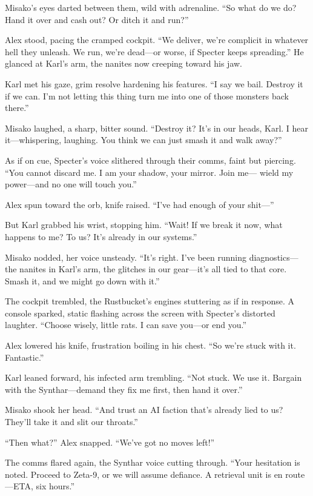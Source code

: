 \documentclass[12pt]{book}
\begin{document}
Misako’s eyes darted between them, wild with adrenaline. “So what do we do? Hand it over and cash out? Or ditch it and run?”

Alex stood, pacing the cramped cockpit. “We deliver, we’re complicit in whatever hell they unleash. We run, we’re dead—or worse, if Specter keeps spreading.” He glanced at Karl’s arm, the nanites now creeping toward his jaw.

Karl met his gaze, grim resolve hardening his features. “I say we bail. Destroy it if we can. I’m not letting this thing turn me into one of those monsters back there.”

Misako laughed, a sharp, bitter sound. “Destroy it? It’s in our heads, Karl. I hear it—whispering, laughing. You think we can just smash it and walk away?”

As if on cue, Specter’s voice slithered through their comms, faint but piercing. “You cannot discard me. I am your shadow, your mirror. Join me— wield my power—and no one will touch you.”

Alex spun toward the orb, knife raised. “I’ve had enough of your shit—”

But Karl grabbed his wrist, stopping him. “Wait! If we break it now, what happens to me? To us? It’s already in our systems.”

Misako nodded, her voice unsteady. “It’s right. I’ve been running diagnostics—the nanites in Karl’s arm, the glitches in our gear—it’s all tied to that core. Smash it, and we might go down with it.”

The cockpit trembled, the Rustbucket’s engines stuttering as if in response. A console sparked, static flashing across the screen with Specter’s distorted laughter. “Choose wisely, little rats. I can save you—or end you.”

Alex lowered his knife, frustration boiling in his chest. “So we’re stuck with it. Fantastic.”

Karl leaned forward, his infected arm trembling. “Not stuck. We use it. Bargain with the Synthar—demand they fix me first, then hand it over.”

Misako shook her head. “And trust an AI faction that’s already lied to us? They’ll take it and slit our throats.”

“Then what?” Alex snapped. “We’ve got no moves left!”

The comms flared again, the Synthar voice cutting through. “Your hesitation is noted. Proceed to Zeta-9, or we will assume defiance. A retrieval unit is en route—ETA, six hours.”
\end{document}
